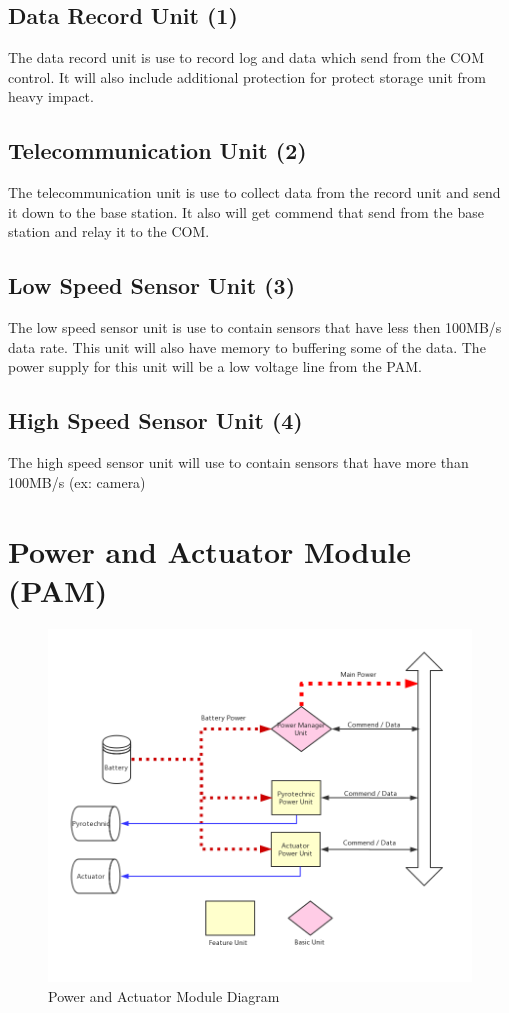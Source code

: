 \documentclass[12pt,article]{memoir}
\begin{document}
\subsection{Data Record Unit (1)}
The data record unit is use to record log and data which send from the COM control. It will also include additional protection for protect storage unit from heavy impact.
\subsection{Telecommunication Unit (2)}
The telecommunication unit is use to collect data from the record unit and send it down to the base station. It also will get commend that send from the base station and relay it to the COM.
\subsection{Low Speed Sensor Unit (3)}
The low speed sensor unit is use to contain sensors that have less then 100MB/s data rate. This unit will also have memory to buffering some of the data. The power supply for this unit will be a low voltage line from the PAM.
\subsection{High Speed Sensor Unit (4)}
The high speed sensor unit will use to contain sensors that have more than 100MB/s (ex: camera) 
\clearpage
\section{Power and Actuator Module (PAM)}
\begin{figure}[h]
\includegraphics[width=\textwidth]{img/ES00003_PAMdia.png}
 \caption{Power and Actuator Module Diagram}	
\end{figure}
\end{document}
